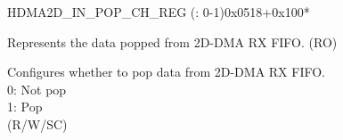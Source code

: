 \begin{register}{H}{DMA2D\_IN\_POP\_CH\_REG (: 0-1)}{0x0518+0x100*}\label{regdesc:DMA2DINPOPCHNREG}
%
%
%
\regnewline%
\begin{regdesc}\begin{reglist}
\label{fielddesc:DMA2DINFIFORDATACHN}\item [DMA2D\_INFIFO\_RDATA\_CH\regindex{n}] Represents the data popped from 2D-DMA RX FIFO. (RO)
\label{fielddesc:DMA2DINFIFOPOPCHN}\item [DMA2D\_INFIFO\_POP\_CH\regindex{n}] Configures whether to pop data from 2D-DMA RX FIFO.\\
0: Not pop\\
1: Pop\\ (R/W/SC)
\end{reglist}\end{regdesc}
\end{register}


